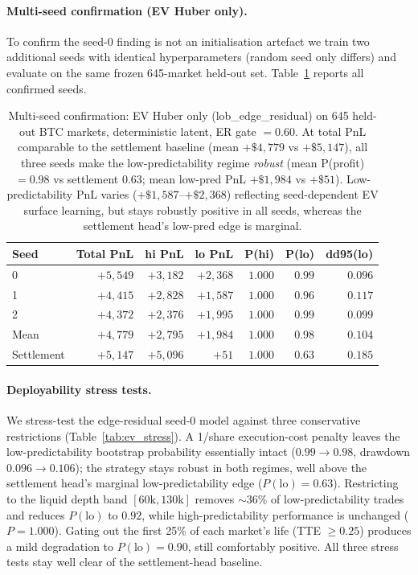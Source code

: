 \documentclass{article}
\begin{document}
\paragraph{Multi-seed confirmation (EV Huber only).}
To confirm the seed-0 finding is not an initialisation artefact we train
two additional seeds with identical hyperparameters (random seed only
differs) and evaluate on the same frozen 645-market held-out set.
Table~\ref{tab:ev_seeds} reports all confirmed seeds.

\begin{table}[t]
\centering
\small
\begin{tabular}{lrrrrrr}
\toprule
Seed & Total PnL & hi PnL & lo PnL & P(hi) & P(lo) & dd95(lo) \\
\midrule
0 & $+5{,}549$ & $+3{,}182$ & $+2{,}368$ & $1.000$ & $0.99$ & $0.096$ \\
1 & $+4{,}415$ & $+2{,}828$ & $+1{,}587$ & $1.000$ & $0.96$ & $0.117$ \\
2 & $+4{,}372$ & $+2{,}376$ & $+1{,}995$ & $1.000$ & $0.99$ & $0.099$ \\
\midrule
Mean & $+4{,}779$ & $+2{,}795$ & $+1{,}984$ & $1.000$ & $0.98$ & $0.104$ \\
\midrule
Settlement & $+5{,}147$ & $+5{,}096$ & $+51$  & $1.000$ & $0.63$ & $0.185$ \\
\bottomrule
\end{tabular}
\caption{Multi-seed confirmation: EV Huber only (lob\_edge\_residual) on 645 held-out
BTC markets, deterministic latent, ER gate $=0.60$.  At total PnL comparable to the
settlement baseline (mean $+\$4{,}779$ vs $+\$5{,}147$), all three seeds make the
low-predictability regime \emph{robust} (mean P(profit)$=0.98$ vs settlement $0.63$;
mean low-pred PnL $+\$1{,}984$ vs $+\$51$).  Low-predictability PnL varies
($+\$1{,}587$--$+\$2{,}368$) reflecting seed-dependent EV surface learning, but stays
robustly positive in all seeds, whereas the settlement head's low-pred edge is marginal.}
\label{tab:ev_seeds}
\end{table}

\paragraph{Deployability stress tests.}
We stress-test the edge-residual seed-0 model against three conservative
restrictions (Table~\ref{tab:ev_stress}).
A 1\textcent/share execution-cost penalty leaves the low-predictability
bootstrap probability essentially intact ($0.99 \to 0.98$, drawdown
$0.096 \to 0.106$); the strategy stays robust in both regimes, well above the
settlement head's marginal low-predictability edge ($P(\text{lo}){=}0.63$).
Restricting to the liquid depth band $[60\text{k},130\text{k}]$ removes
$\sim$36\% of low-predictability trades and reduces $P(\text{lo})$ to $0.92$,
while high-predictability performance is unchanged ($P{=}1.000$).
Gating out the first 25\% of each market's life (TTE $\geq 0.25$) produces a
mild degradation to $P(\text{lo}){=}0.90$, still comfortably positive.
All three stress tests stay well clear of the settlement-head baseline.
\end{document}
